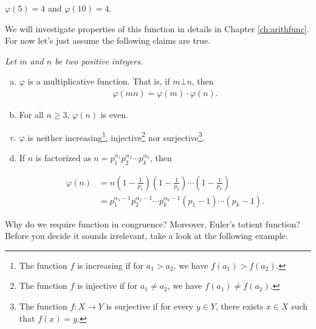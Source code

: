 \documentclass{subfile}
\begin{document}
	\begin{example}
		$\varphi(5)=4$ and $\varphi(10)=4$. 
	\end{example}
	
	We will investigate properties of this function in details in Chapter \ref{ch:arithfunc}. For now let's just assume the following claims are true.
	\begin{proposition}\label{prop:phiproperties}\slshape
		Let $m$ and $n$ be two positive integers.
		\begin{enumerate}[(a)]
			\item $\varphi$ is a multiplicative function. That is, if $m \bot n$, then
			\begin{align*}
				\varphi(mn)=\varphi(m) \cdot \varphi (n).
			\end{align*}
			\item For all $n \geq 3$, $\varphi(n)$ is even.
			\item $\varphi$ is neither increasing\footnote{The function $f$ is increasing if for $a_1 >a_2$, we have  $f(a_1) > f(a_2)$.}, injective\footnote{The function $f$ is injective if for $a_1 \neq a_2$, we have $f(a_1) \neq f(a_2)$.} nor surjective\footnote{The function $f:X \to Y$ is surjective if for every $y \in Y$, there exists $x \in X$ such that $f(x)=y$.}. 
			\item If $n$ is factorized as $n= p_1^{\alpha_1} p_2^{\alpha_2} \cdots p_k^{\alpha_k}$, then
			
			\begin{align*}
				\varphi(n) & =n \left( 1 - \frac{1}{p_1} \right)  \left( 1 - \frac{1}{p_2} \right)  \cdots \left( 1 - \frac{1}{p_k} \right)  \\
				& = p_1^{\alpha_1-1} p_2^{\alpha_2-1} \cdots p_k^{\alpha_k-1} \left( p_1 -1 \right) \cdots \left( p_k -1 \right) .
			\end{align*}					
			
		\end{enumerate}
	\end{proposition}
	
	
	Why do we require function in congruence? Moreover, Euler's totient function? Before you decide it sounds irrelevant, take a look at the following example.
	
\end{document}
